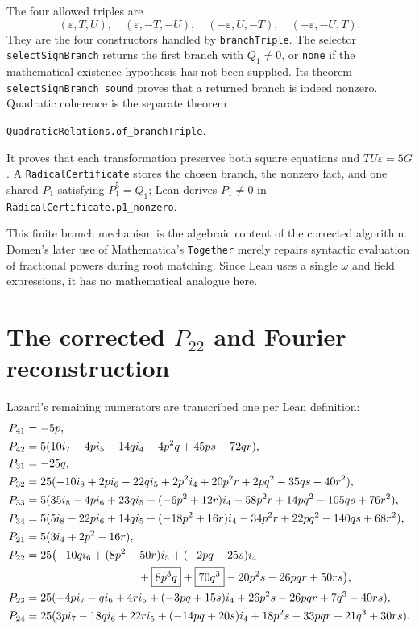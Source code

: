 \documentclass[11pt,a4paper,oneside]{article}
\newcommand{\lean}[1]{\nolinkurl{#1}}
\newcommand{\eps}{\varepsilon}
\newcommand{\ii}[1]{i_{#1}}
\begin{document}
The four allowed triples are
\[
(\eps,T,U),\quad(\eps,-T,-U),\quad(-\eps,U,-T),\quad(-\eps,-U,T).
\]
They are the four constructors handled by \lean{branchTriple}.  The selector
\lean{selectSignBranch} returns the first branch with $Q_1\ne0$, or
\lean{none} if the mathematical existence hypothesis has not been supplied.
Its theorem \lean{selectSignBranch_sound} proves that a returned branch is
indeed nonzero.  Quadratic coherence is the separate theorem
\begin{center}
\lean{QuadraticRelations.of_branchTriple}.
\end{center}
It proves that each transformation preserves both square equations and
$TU\eps=5G$.  A \lean{RadicalCertificate} stores the chosen branch, the
nonzero fact, and one shared $P_1$ satisfying $P_1^5=Q_1$; Lean derives
$P_1\ne0$ in \lean{RadicalCertificate.p1_nonzero}.

This finite branch mechanism is the algebraic content of the corrected
algorithm.  Domen's later use of Mathematica's \lean{Together} merely repairs
syntactic evaluation of fractional powers during root matching.  Since Lean
uses a single $\omega$ and field expressions, it has no mathematical analogue
here.

\section[The corrected P22 and Fourier reconstruction]
  {The corrected $P_{22}$ and Fourier reconstruction}

Lazard's remaining numerators are transcribed one per Lean definition:
\begin{align*}
P_{41}&=-5p,\\
P_{42}&=5(10\ii7-4p\ii5-14q\ii4-4p^2q+45ps-72qr),\\
P_{31}&=-25q,\\
P_{32}&=25(-10\ii8+2p\ii6-22q\ii5+2p^2\ii4+20p^2r+2pq^2-35qs-40r^2),\\
P_{33}&=5(35\ii8-4p\ii6+23q\ii5+(-6p^2+12r)\ii4
 -58p^2r+14pq^2-105qs+76r^2),\\
P_{34}&=5(5\ii8-22p\ii6+14q\ii5+(-18p^2+16r)\ii4
 -34p^2r+22pq^2-140qs+68r^2),\\
P_{21}&=5(3\ii4+2p^2-16r),\\
P_{22}&=25\bigl(-10q\ii6+(8p^2-50r)\ii5+(-2pq-25s)\ii4\\
&\hspace{35mm}+\boxed{8p^3q}+\boxed{70q^3}-20p^2s-26pqr+50rs\bigr),\\
P_{23}&=25(-4p\ii7-q\ii6+4r\ii5+(-3pq+15s)\ii4
 +26p^2s-26pqr+7q^3-40rs),\\
P_{24}&=25(3p\ii7-18q\ii6+22r\ii5+(-14pq+20s)\ii4
 +18p^2s-33pqr+21q^3+30rs).
\end{align*}
\end{document}

